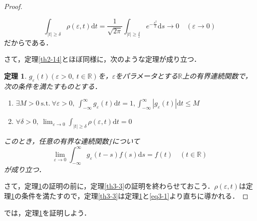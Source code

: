 \documentclass[a4j]{jsbook}
\newtheorem{theorem}{定理}
\numberwithin{theorem}{chapter}  %
\begin{document}
\begin{proof}
\begin{enumerate}
    \begin{equation*}
        \int_{|t|\geq\delta}\rho(\varepsilon, t)\mathrm{d}t=\frac{1}{\sqrt{2\pi}}\int_{|t|\geq\frac{\delta}{\varepsilon}}e^{-\frac{s^2}{2}}\mathrm{d}s\to 0\quad(\varepsilon\to 0)
    \end{equation*}
    だからである．
\end{enumerate}
さて，定理\ref{th2-14}とほぼ同様に，次のような定理が成り立つ．
\begin{theorem}
\label{th3-4}
\(g_\varepsilon(t)(\varepsilon>0,\ t\in\mathbb{R})\)を，\(\varepsilon\)をパラメータとする\(\mathbb{R}\)上の有界連続関数で，次の条件を満たすものとする．
\begin{enumerate}
    \renewcommand{\labelenumi}{(\roman{enumi})}
    \item \(\displaystyle\exists M>0\ \mathrm{s.t.}\ \forall\varepsilon>0,\ \int_{-\infty}^\infty g_\varepsilon(t)\mathrm{d}t=1, \int_{-\infty}^\infty|g_\varepsilon(t)|\mathrm{d}t\leq M\)
    \item \(\displaystyle\forall\delta>0,\ \lim_{\varepsilon\to 0}\int_{|t|\geq\delta}\rho(\varepsilon, t)\mathrm{d}t=0\)
\end{enumerate}
このとき，任意の有界な連続関数\(f\)について
\begin{equation*}
    \lim_{\varepsilon\to 0}\int_{-\infty}^\infty g_\varepsilon(t-s)f(s)\mathrm{d}s=f(t)\quad(t\in\mathbb{R})
\end{equation*}
が成り立つ．
\end{theorem}
さて，定理\ref{th3-4}の証明の前に，定理\ref{th3-3}の証明を終わらせておこう．\(\rho(\varepsilon, t)\)は定理\ref{th3-4}の条件を満たすので，定理\ref{th3-3}は定理\ref{th3-4}と\eqref{eq3-1}より直ちに導かれる．
\end{proof}
では，定理\ref{th3-4}を証明しよう．
\end{document}
